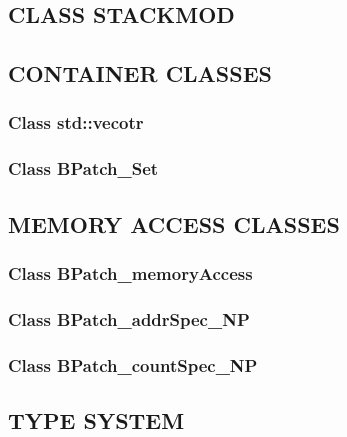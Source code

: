 \subsection{CLASS STACKMOD}\label{sec:bpatch_stackmod}

\subsection{CONTAINER CLASSES}
\subsubsection{Class std::vecotr}
\subsubsection{Class BPatch\_Set}

\subsection{MEMORY ACCESS CLASSES}
\subsubsection{Class BPatch\_memoryAccess}\label{sec:bpatch_memoryaccess}
\subsubsection{Class BPatch\_addrSpec\_NP}
\subsubsection{Class BPatch\_countSpec\_NP}
\subsection{TYPE SYSTEM}\label{sec:type_system}

\pagebreak
